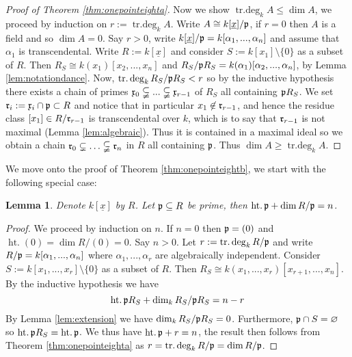 \documentclass[12pt]{article}
\theoremstyle{plain}
\newtheorem{lemma}[thm]{Lemma}
\theoremstyle{definition}
\begin{document}
\begin{proof}[Proof of Theorem \ref{thm:onepointeighta}]
Now we show $\operatorname{tr.deg}_kA \leq \operatorname{dim}A$, we proceed by induction on $r:= \operatorname{tr.deg}_kA$. Write $A \cong k[\underline{x}]/\frak{p}$, if $r = 0$ then $A$ is a field and so $\operatorname{dim}A = 0$. Say $r > 0$, write $k[\underline{x}]/\frak{p} = k[\alpha_1,...,\alpha_n]$ and assume that $\alpha_1$ is transcendental. Write $R := k[\underline{x}]$ and consider $S := k[x_1]\setminus\lbrace 0 \rbrace$ as a subset of $R$. Then $R_S \cong k(x_1)[x_2,...,x_n]$ and $R_S/\frak{p}R_S = k(\alpha_1)[\alpha_2,...,\alpha_n]$, by Lemma \ref{lem:notationdance}. Now, $\operatorname{tr.deg}_kR_S/\frak{p}R_S < r$ so by the inductive hypothesis there exists a chain of primes $\frak{x}_0 \subsetneqq ... \subsetneqq \frak{x}_{r-1}$ of $R_S$ all containing $\frak{p}R_S$. We set $\frak{r}_i := \frak{x}_i \cap \frak{p} \subset R$ and notice that in particular $x_1 \not\in \frak{r}_{r-1}$, and hence the residue class $[x_1] \in R/\frak{r}_{r-1}$ is transcendental over $k$, which is to say that $\frak{r}_{r-1}$ is not maximal (Lemma \ref{lem:algebraic}). Thus it is contained in a maximal ideal so we obtain a chain $\frak{r}_0 \subsetneq \hdots \subsetneqq \frak{r}_n$ in $R$ all containing $\frak{p}$. Thus $\operatorname{dim}A\geq \operatorname{tr.deg}_kA$.
\end{proof}
We move onto the proof of Theorem \ref{thm:onepointeightb}, we start with the following special case:
\begin{lemma}
\label{lemma:onepointeightb}
Denote $k[\underline{x}]$ by $R$. Let $\frak{p} \subseteq R$ be prime, then $\operatorname{ht.}\frak{p} + \operatorname{dim}R/\frak{p} = n$.
\end{lemma}
\begin{proof}
We proceed by induction on $n$. If $n = 0$ then $\frak{p} = (0)$ and $\operatorname{ht.}(0) = \operatorname{dim}R/(0) = 0$. Say $n > 0$. Let $r := \operatorname{tr.deg}_kR/\frak{p}$ and write $R/\frak{p} = k[\alpha_1,...,\alpha_n]$ where $\alpha_1,...,\alpha_r$ are algebraically independent. Consider $S := k[x_1,...,x_r]\setminus\lbrace 0 \rbrace$ as a subset of $R$. Then $R_S \cong k(x_1,...,x_r)[x_{r+1},...,x_n]$. By the inductive hypothesis we have
\[\operatorname{ht.}\frak{p}R_S + \operatorname{dim}_kR_S/\frak{p}R_S = n - r\]
By Lemma \ref{lem:extension} we have $\operatorname{dim}_kR_S/\frak{p}R_S = 0$. Furthermore, $\frak{p} \cap S = \varnothing$ so $\operatorname{ht.}\frak{p}R_S = \operatorname{ht.}\frak{p}$. We thus have $\operatorname{ht.}\frak{p} + r = n$, the result then follows from Theorem \ref{thm:onepointeighta} as $r = \operatorname{tr.deg}_kR/\frak{p} = \operatorname{dim}R/\frak{p}$.
\end{proof}
\end{document}
